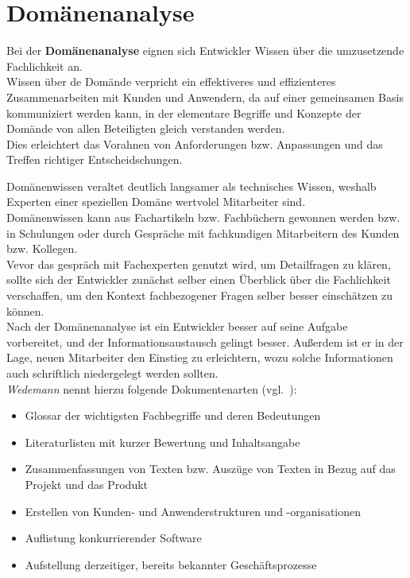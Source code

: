 \section{Domänenanalyse}

\noindent
Bei der \textbf{Domänenanalyse} eignen sich Entwickler Wissen über die umzusetzende Fachlichkeit an.\\

\noindent
Wissen über de Domände verpricht ein effektiveres und effizienteres Zusammenarbeiten mit Kunden und Anwendern, da auf einer gemeinsamen Basis kommuniziert werden kann, in der elementare Begriffe und Konzepte der Domände von allen Beteiligten gleich verstanden werden.\\
Dies erleichtert das Vorahnen von Anforderungen bzw. Anpassungen und das Treffen richtiger Entscheidschungen.

\noindent
Domänenwissen veraltet deutlich langsamer als technisches Wissen, weshalb Experten einer speziellen Domäne wertvolel Mitarbeiter sind.\\

\noindent
Domänenwissen kann aus Fachartikeln bzw. Fachbüchern gewonnen werden bzw. in Schulungen oder durch Gespräche mit fachkundigen Mitarbeitern des Kunden bzw. Kollegen.\\
Vevor das gespräch mit Fachexperten genutzt wird, um Detailfragen zu klären, sollte sich der Entwickler zunächst selber einen Überblick über die Fachlichkeit verschaffen, um den Kontext fachbezogener Fragen selber besser einschätzen zu können.\\

\noindent
Nach der Domänenanalyse ist ein Entwickler besser auf seine Aufgabe vorbereitet, und der Informationsaustausch gelingt besser.
Außerdem ist er in der Lage, neuen Mitarbeiter den Einstieg zu erleichtern, wozu solche Informationen auch schriftlich niedergelegt werden sollten.\\
\textit{Wedemann} nennt hierzu folgende Dokumentenarten (vgl.~\cite[42]{Wed09}):

\begin{itemize}
    \item Glossar der wichtigsten Fachbegriffe und deren Bedeutungen
    \item Literaturlisten mit kurzer Bewertung und Inhaltsangabe
    \item Zusammenfassungen von Texten bzw. Auszüge von Texten in Bezug auf das Projekt und das Produkt
    \item Erstellen von Kunden- und Anwenderstrukturen und -organisationen
    \item Auflistung konkurrierender Software
    \item Aufstellung derzeitiger, bereits bekannter Geschäftsprozesse
\end{itemize}